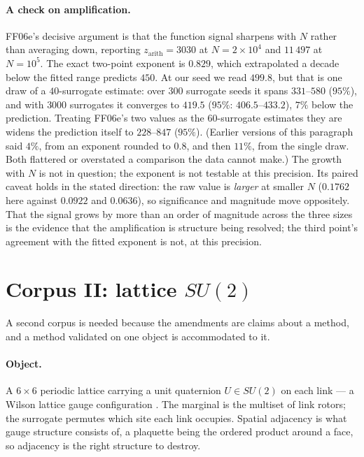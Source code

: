\documentclass[11pt]{article}
\theoremstyle{remark}
\begin{document}
\paragraph{A check on amplification.} FF06e's decisive argument is that the function
signal sharpens with $N$ rather than averaging down, reporting $z_{\mathrm{arith}}=3030$
at $N=2\times10^4$ and $11\,497$ at $N=10^5$. The exact two-point exponent is
$0.829$, which extrapolated a decade below the fitted range predicts $450$. At our seed
we read $499.8$, but that is one draw of a $40$-surrogate estimate: over $300$ surrogate
seeds it spans $331$--$580$ ($95\%$), and with $3000$ surrogates it converges to $419.5$
($95\%$: $406.5$--$433.2$), $7\%$ below the prediction. Treating FF06e's two values as the
$60$-surrogate estimates they are widens the prediction itself to $228$--$847$ ($95\%$).
(Earlier versions of this paragraph said $4\%$, from an exponent rounded to $0.8$, and then
$11\%$, from the single draw. Both flattered or overstated a comparison the data cannot
make.) The growth with $N$ is not in question; the exponent is not testable at this
precision. Its paired caveat holds in the stated direction: the raw value is
\emph{larger} at smaller $N$ ($0.1762$ here against $0.0922$ and $0.0636$), so
significance and magnitude move oppositely. That the signal grows by more than an order of
magnitude across the three sizes is the evidence that the amplification is structure being
resolved; the third point's agreement with the fitted exponent is not, at this precision.

\section{Corpus II: lattice $SU(2)$}\label{sec:lattice}

A second corpus is needed because the amendments are claims about a method, and a method
validated on one object is accommodated to it.

\paragraph{Object.} A $6\times6$ periodic lattice carrying a unit quaternion
$U\in SU(2)$ on each link --- a Wilson lattice gauge configuration \cite{wilson}. The
marginal is the multiset of link rotors; the surrogate permutes which site each link
occupies. Spatial adjacency is what gauge structure consists of, a plaquette being the
ordered product around a face, so adjacency is the right structure to destroy.
\end{document}
